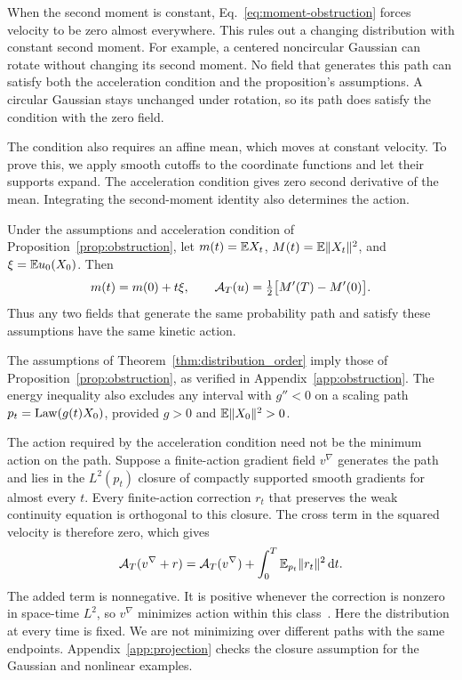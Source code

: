 When the second moment is constant, Eq.~\eqref{eq:moment-obstruction} forces velocity to be zero almost everywhere. This rules out a changing distribution with constant second moment. For example, a centered noncircular Gaussian can rotate without changing its second moment. No field that generates this path can satisfy both the acceleration condition and the proposition's assumptions. A circular Gaussian stays unchanged under rotation, so its path does satisfy the condition with the zero field.

The condition also requires an affine mean, which moves at constant velocity. To prove this, we apply smooth cutoffs to the coordinate functions and let their supports expand. The acceleration condition gives zero second derivative of the mean. Integrating the second-moment identity also determines the action.
\begin{corollary}
\label{cor:mean-action}
Under the assumptions and acceleration condition of Proposition~\ref{prop:obstruction}, let $m(t)=\mathbb E X_t$, $M(t)=\mathbb E\|X_t\|^2$, and $\xi=\mathbb E u_0(X_0)$. Then
\begin{equation}
 m(t)=m(0)+t\xi,\qquad
 \mathcal A_T(u)=\tfrac12\bigl[M'(T)-M'(0)\bigr].
 \label{eq:mean-action}
\end{equation}
Thus any two fields that generate the same probability path and satisfy these assumptions have the same kinetic action.
\end{corollary}

The assumptions of Theorem~\ref{thm:distribution_order} imply those of Proposition~\ref{prop:obstruction}, as verified in Appendix~\ref{app:obstruction}. The energy inequality also excludes any interval with $g''<0$ on a scaling path $p_t=\operatorname{Law}(g(t)X_0)$, provided $g>0$ and $\mathbb E\|X_0\|^2>0$.

The action required by the acceleration condition need not be the minimum action on the path. Suppose a finite-action gradient field $v^\nabla$ generates the path and lies in the $L^2(p_t)$ closure of compactly supported smooth gradients for almost every $t$. Every finite-action correction $r_t$ that preserves the weak continuity equation is orthogonal to this closure. The cross term in the squared velocity is therefore zero, which gives
\begin{equation}
 \mathcal A_T(v^\nabla+r)
 =\mathcal A_T(v^\nabla)+\int_0^T\mathbb E_{p_t}\|r_t\|^2\,\mathrm d t.
 \label{eq:projection}
\end{equation}
The added term is nonnegative. It is positive whenever the correction is nonzero in space-time $L^2$, so $v^\nabla$ minimizes action within this class~\citep{ambrosio2005gradient,liu2022marginal,neklyudov2023action}. Here the distribution at every time is fixed. We are not minimizing over different paths with the same endpoints. Appendix~\ref{app:projection} checks the closure assumption for the Gaussian and nonlinear examples.

